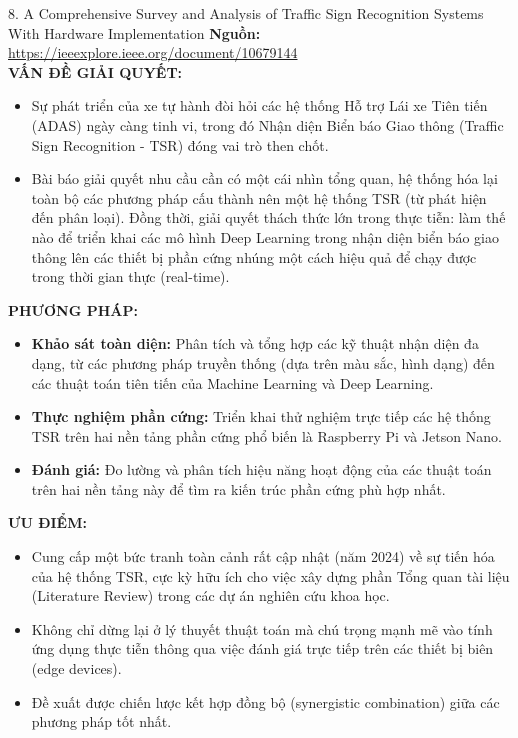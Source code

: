 \documentclass[12pt,a4paper]{article}
\newcommand{\subheading}[1]{\vspace{0.3cm}\noindent\textbf{\textcolor{primary}{\MakeUppercase{#1}:}}\par\vspace{0.1cm}}
\begin{document}
\begin{paperbox}{8. A Comprehensive Survey and Analysis of Traffic Sign Recognition Systems With Hardware Implementation}
    \textbf{Nguồn:} \url{https://ieeexplore.ieee.org/document/10679144}\\

    \subheading{Vấn đề giải quyết}
    \begin{itemize}
        \item Sự phát triển của xe tự hành đòi hỏi các hệ thống Hỗ trợ Lái xe Tiên tiến (ADAS) ngày càng tinh vi, trong đó Nhận diện Biển báo Giao thông (Traffic Sign Recognition - TSR) đóng vai trò then chốt.
        \item Bài báo giải quyết nhu cầu cần có một cái nhìn tổng quan, hệ thống hóa lại toàn bộ các phương pháp cấu thành nên một hệ thống TSR (từ phát hiện đến phân loại). Đồng thời, giải quyết thách thức lớn trong thực tiễn: làm thế nào để triển khai các mô hình Deep Learning trong nhận diện biển báo giao thông lên các thiết bị phần cứng nhúng một cách hiệu quả để chạy được trong thời gian thực (real-time).
    \end{itemize}

    \subheading{Phương pháp}
    \begin{itemize}
        \item \textbf{Khảo sát toàn diện:} Phân tích và tổng hợp các kỹ thuật nhận diện đa dạng, từ các phương pháp truyền thống (dựa trên màu sắc, hình dạng) đến các thuật toán tiên tiến của Machine Learning và Deep Learning.
        \item \textbf{Thực nghiệm phần cứng:} Triển khai thử nghiệm trực tiếp các hệ thống TSR trên hai nền tảng phần cứng phổ biến là Raspberry Pi và Jetson Nano.
        \item \textbf{Đánh giá:} Đo lường và phân tích hiệu năng hoạt động của các thuật toán trên hai nền tảng này để tìm ra kiến trúc phần cứng phù hợp nhất.
    \end{itemize}

    \subheading{Ưu điểm}
    \begin{itemize}
        \item Cung cấp một bức tranh toàn cảnh rất cập nhật (năm 2024) về sự tiến hóa của hệ thống TSR, cực kỳ hữu ích cho việc xây dựng phần Tổng quan tài liệu (Literature Review) trong các dự án nghiên cứu khoa học.
        \item Không chỉ dừng lại ở lý thuyết thuật toán mà chú trọng mạnh mẽ vào tính ứng dụng thực tiễn thông qua việc đánh giá trực tiếp trên các thiết bị biên (edge devices).
        \item Đề xuất được chiến lược kết hợp đồng bộ (synergistic combination) giữa các phương pháp tốt nhất.
    \end{itemize}


\end{paperbox}
\end{document}
